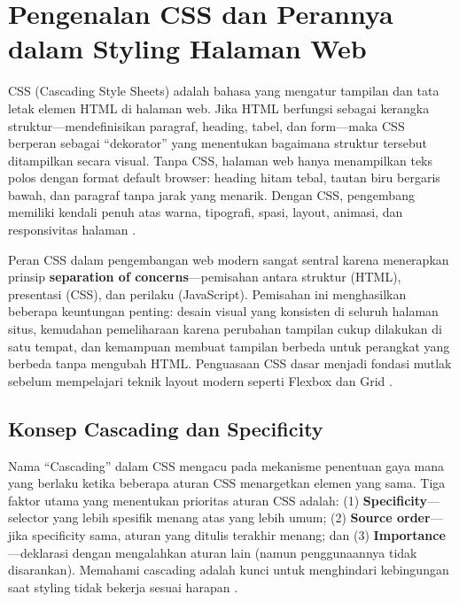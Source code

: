 ﻿\section{Pengenalan CSS dan Perannya dalam Styling Halaman Web}

CSS (Cascading Style Sheets) adalah bahasa yang mengatur tampilan dan tata letak elemen HTML di halaman web. Jika HTML berfungsi sebagai kerangka struktur---mendefinisikan paragraf, heading, tabel, dan form---maka CSS berperan sebagai ``dekorator'' yang menentukan bagaimana struktur tersebut ditampilkan secara visual. Tanpa CSS, halaman web hanya menampilkan teks polos dengan format default browser: heading hitam tebal, tautan biru bergaris bawah, dan paragraf tanpa jarak yang menarik. Dengan CSS, pengembang memiliki kendali penuh atas warna, tipografi, spasi, layout, animasi, dan responsivitas halaman \cite{mdnCss}.

Peran CSS dalam pengembangan web modern sangat sentral karena menerapkan prinsip \textbf{separation of concerns}---pemisahan antara struktur (HTML), presentasi (CSS), dan perilaku (JavaScript). Pemisahan ini menghasilkan beberapa keuntungan penting: desain visual yang konsisten di seluruh halaman situs, kemudahan pemeliharaan karena perubahan tampilan cukup dilakukan di satu tempat, dan kemampuan membuat tampilan berbeda untuk perangkat yang berbeda tanpa mengubah HTML. Penguasaan CSS dasar menjadi fondasi mutlak sebelum mempelajari teknik layout modern seperti Flexbox dan Grid \cite{webdevCss}.

\subsection{Konsep Cascading dan Specificity}

Nama ``Cascading'' dalam CSS mengacu pada mekanisme penentuan gaya mana yang berlaku ketika beberapa aturan CSS menargetkan elemen yang sama. Tiga faktor utama yang menentukan prioritas aturan CSS adalah: (1) \textbf{Specificity}---selector yang lebih spesifik menang atas yang lebih umum; (2) \textbf{Source order}---jika specificity sama, aturan yang ditulis terakhir menang; dan (3) \textbf{Importance}---deklarasi dengan  mengalahkan aturan lain (namun penggunaannya tidak disarankan). Memahami cascading adalah kunci untuk menghindari kebingungan saat styling tidak bekerja sesuai harapan \cite{webdevCss}.

